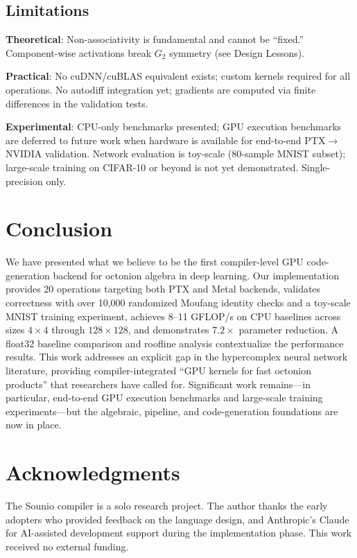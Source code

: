 \documentclass[11pt,a4paper]{article}
\begin{document}
\subsection{Limitations}

\textbf{Theoretical}: Non-associativity is fundamental and cannot be ``fixed.'' Component-wise activations break $G_2$ symmetry (see Design Lessons).

\textbf{Practical}: No cuDNN/cuBLAS equivalent exists; custom kernels required for all operations. No autodiff integration yet; gradients are computed via finite differences in the validation tests.

\textbf{Experimental}: CPU-only benchmarks presented; GPU execution benchmarks are deferred to future work when hardware is available for end-to-end PTX$\to$NVIDIA validation. Network evaluation is toy-scale (80-sample MNIST subset); large-scale training on CIFAR-10 or beyond is not yet demonstrated. Single-precision only.

\section{Conclusion}
\label{sec:conclusion}

We have presented what we believe to be the first compiler-level GPU code-generation backend for octonion algebra in deep learning. Our implementation provides 20 operations targeting both PTX and Metal backends, validates correctness with over 10{,}000 randomized Moufang identity checks and a toy-scale MNIST training experiment, achieves 8--11 GFLOP/s on CPU baselines across sizes $4 \times 4$ through $128 \times 128$, and demonstrates $7.2\times$ parameter reduction. A float32 baseline comparison and roofline analysis contextualize the performance results. This work addresses an explicit gap in the hypercomplex neural network literature, providing compiler-integrated ``GPU kernels for fast octonion products'' that researchers have called for. Significant work remains---in particular, end-to-end GPU execution benchmarks and large-scale training experiments---but the algebraic, pipeline, and code-generation foundations are now in place.

\section*{Acknowledgments}

The Sounio compiler is a solo research project. The author thanks the early adopters who provided feedback on the language design, and Anthropic's Claude for AI-assisted development support during the implementation phase. This work received no external funding.
\end{document}
